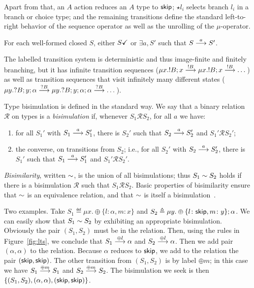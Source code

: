 Apart from that, an $A$ action reduces an $A$ type to $\skipk$; $\star
l_i$ selects branch $l_i$ in a branch or choice type; and the
remaining transitions define the standard left-to-right behavior of
the sequence operator as well as the unrolling of the $\mu$-operator.
\begin{lemma}[Progress]\label{lemma:lts-progress}
  For each well-formed closed $S$, either $\DONE{S}$ or
  $\exists a, S'$ such that $S \LTSderives S'$.
\end{lemma}


The labelled transition system is deterministic and thus 
image-finite and finitely branching, but it has infinite transition
sequences 
($\mu x.!B;x \LTSderives[!B] \mu x.!B;x \LTSderives[!B] \dots$) as
well as transition sequences that visit
infinitely many different states
($\mu y.?B;y;\alpha \LTSderives[?B] \mu y.?B;y;\alpha;\alpha
\LTSderives[?B] \dots$).

Type bisimulation is defined in the standard way. We say that a binary
relation $\mathcal R$ on types is a \emph{bisimulation} if,
whenever $S_1 \mathcal R S_2$, for all $a$ we have:
%
\begin{enumerate}
\item for all $S_1'$ with $S_1 \LTSderives S_1'$, there is $S_2'$ such that $S_2
  \LTSderives S_2'$ and
  $S_1' \mathcal R S_2'$;
\item the converse, on transitions from $S_2$; i.e., for all $S_2'$ with
  $S_2 \LTSderives S_2'$, there is $S_1'$ such that $S_1 \LTSderives S_1'$ and
  $S_1' \mathcal R S_2'$.
\end{enumerate}

\emph{Bisimilarity}, written $\TypeEquiv$, is the union of all
bisimulations; thus $S_1 \TypeEquiv S_2$ holds if there is a bisimulation
$\mathcal R$ such that $S_1 \mathcal R S_2$.
%
Basic properties of bisimilarity ensure that $\TypeEquiv$ is an
equivalence relation, and that $\TypeEquiv$ is itself a
bisimulation~\cite{sangiorgi2014introduction}.

Two examples.
%
Take $S_1 \eqdef \mu x.\oplus\{l\colon \alpha, m\colon x\}$ and
$S_2 \eqdef \mu y.\oplus\{l\colon \skipk, m\colon y\}; \alpha$.  We
can easily show that $S_1 \TypeEquiv S_2$ by exhibiting an appropriate
bisimulation. Obviously the pair $(S_1,S_2)$ must be in the
relation. Then, using the rules in Figure~\ref{fig:lts}, we conclude
that $S_1 \LTSderives[\oplus l] \alpha$ and
$S_2 \LTSderives[\oplus l] \alpha$. Then we add pair $(\alpha,\alpha)$
to the relation. Because $\alpha$ reduces to $\skipk$, we add to the
relation the pair $(\skipk,\skipk)$. The other transition from
$(S_1,S_2)$ is by label $\oplus m$; in this case we have
$S_1 \LTSderives[\oplus m] S_1$ and $S_2 \LTSderives[\oplus m] S_2$.
The bisimulation we seek is then
$\{(S_1,S_2),(\alpha,\alpha),(\skipk,\skipk)\}$.

